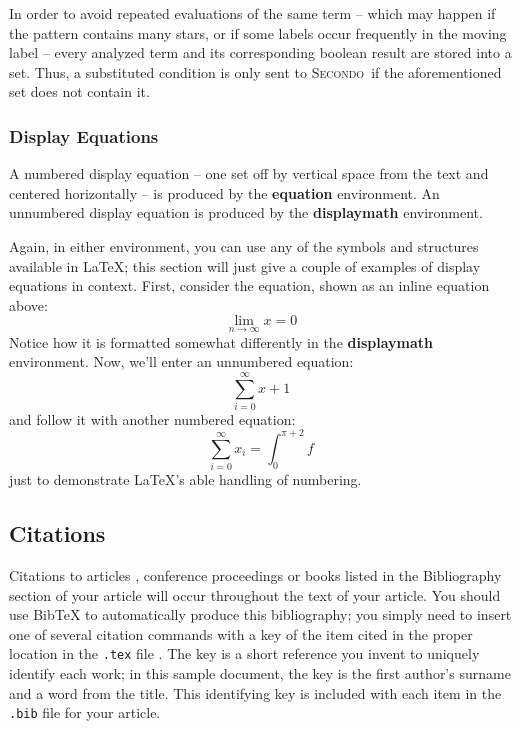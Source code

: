 \documentclass{sig-alternate}
\newcommand{\secondo}{\textsc{Secondo}}
\begin{document}
In order to avoid repeated evaluations of the same term -- which may happen if the pattern contains many stars, or if some labels occur frequently in the moving label -- every analyzed term and its corresponding boolean result are stored into a set. Thus, a substituted condition is only sent to \secondo\ if the aforementioned set does not contain it.\newpage

\subsubsection{Display Equations}
A numbered display equation -- one set off by vertical space
from the text and centered horizontally -- is produced
by the \textbf{equation} environment. An unnumbered display
equation is produced by the \textbf{displaymath} environment.

Again, in either environment, you can use any of the symbols
and structures available in \LaTeX; this section will just
give a couple of examples of display equations in context.
First, consider the equation, shown as an inline equation above:
\begin{equation}\lim_{n\rightarrow \infty}x=0\end{equation}
Notice how it is formatted somewhat differently in
the \textbf{displaymath}
environment.  Now, we'll enter an unnumbered equation:
\begin{displaymath}\sum_{i=0}^{\infty} x + 1\end{displaymath}
and follow it with another numbered equation:
\begin{equation}\sum_{i=0}^{\infty}x_i=\int_{0}^{\pi+2} f\end{equation}
just to demonstrate \LaTeX's able handling of numbering.

\subsection{Citations}
Citations to articles \cite{bowman:reasoning,
clark:pct, braams:babel, herlihy:methodology},
conference proceedings \cite{clark:pct} or
books \cite{salas:calculus, Lamport:LaTeX} listed
in the Bibliography section of your
article will occur throughout the text of your article.
You should use BibTeX to automatically produce this bibliography;
you simply need to insert one of several citation commands with
a key of the item cited in the proper location in
the \texttt{.tex} file \cite{Lamport:LaTeX}.
The key is a short reference you invent to uniquely
identify each work; in this sample document, the key is
the first author's surname and a
word from the title.  This identifying key is included
with each item in the \texttt{.bib} file for your article.
\end{document}
